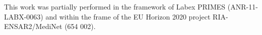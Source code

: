 \documentclass[a4paper,11pt]{article}
\begin{document}





\acknowledgments
This work was partially performed in the framework of Labex PRIMES (ANR-11-LABX-0063) and within the frame of the EU Horizon 2020 project RIA-ENSAR2/MediNet (654 002).  
















\end{document}
